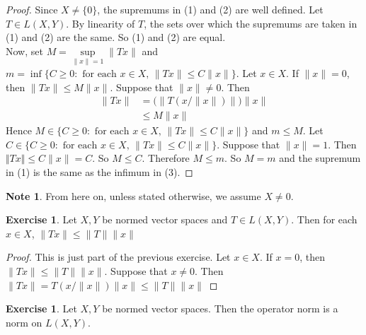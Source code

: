 \documentclass[12pt]{amsart}
\theoremstyle{definition}
\newtheorem{note}[definition]{Note}
\newtheorem{ex}[definition]{Exercise}
\newcommand{\lex}[1]{\label{ex:#1}}
\begin{document}
	\begin{proof} Since $X \neq \{0\}$, the supremums in (1) and (2) are well defined. Let $T \in L(X,Y)$. By linearity of $T$, the sets over which the supremums are taken in (1) and (2) are the same. So (1) and (2) are equal.\\
		Now, set $M = \sup\limits_{\|x \|=1} \|Tx \|$ and $m = \inf \{C \geq 0: \text{ for each }x \in X\text{, } \|Tx \|\leq C \|x \|\}$. Let $x \in X$. If $\|x \|=0$, then $\|Tx \|\leq M \|x \|$. Suppose that $\|x \|\neq 0$. Then 
		\begin{align*}
			\|Tx \|
			&= \bigg(\big\|T(x/\|x\|)\big\|\bigg)\|x \|\\
			& \leq M \|x\|
		\end{align*}
		Hence $M \in \{C \geq 0: \text{ for each }x \in X\text{, } \|Tx \|\leq C \|x \|\}$ and $m \leq M$.
		Let $C \in \{C \geq 0: \text{ for each }x \in X\text{, } \|Tx \|\leq C \|x\|\}$. Suppose that $\|x \|=1$. Then $\Vert Tx\Vert \leq C \|x \|= C$. So $M \leq C$. Therefore $M \leq m$. So $M=m$ and the supremum in (1) is the same as the infimum in (3). 
	\end{proof}
	
	\begin{note}
		From here on, unless stated otherwise, we assume $X \neq 0$.
	\end{note}
	
	\begin{ex} \lex{42007}
		Let $X,Y$ be normed vector spaces and $T \in L(X,Y)$. Then for each $x \in X$, $\|Tx \| \leq \|T\|\|x \|$
	\end{ex}
	
	\begin{proof}
		This is just part of the previous exercise. Let $x \in X$. If $x = 0$, then $\|Tx \|\leq \|T \|\|x \|$. Suppose that $x \neq 0$. Then $\|Tx \|= T(x/\|x\|)\|x\|\leq \|T \|\|x \|$
	\end{proof}
	
	\begin{ex} \lex{42008}
		Let $X, Y$ be normed vector spaces. Then the operator norm is a norm on $L(X,Y)$.
	\end{ex}
	
\end{document}

